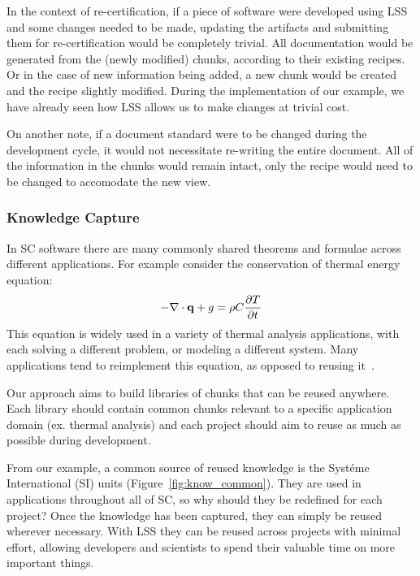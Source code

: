 \documentclass{sig-alternate-05-2015}
\newcommand{\lss}{LSS}
\begin{document}
In the context of re-certification, if a piece of software were developed using
\lss{} and some changes needed to be made, updating the artifacts and submitting
them for re-certification would be completely trivial. All documentation would
be generated from the (newly modified) chunks, according to their existing
recipes. Or in the case of new information being added, a new chunk would be
created and the recipe slightly modified. During the implementation of our
example, we have already seen how \lss{} allows us to make changes at trivial
cost.

On another note, if a document standard were to be changed during the
development cycle, it would not necessitate re-writing the entire document. All
of the information in the chunks would remain intact, only the recipe would need
to be changed to accomodate the new view.

\subsubsection{Knowledge Capture} \label{sssec:adv_knowledge}

In SC software there are many commonly shared theorems and formulae across
different applications. For example consider the conservation of thermal
energy equation:
\begin{displaymath} -{\bf \nabla \cdot q} + g = \rho C
\frac{\partial T}{\partial t} \end{displaymath}
This equation is widely used in a variety of thermal analysis applications, with
each solving a different problem, or modeling a different system. Many
applications tend to reimplement this equation, as opposed to reusing
it~\cite{TODO}. %

Our approach aims to build libraries of chunks that can be reused anywhere. Each
library should contain common chunks relevant to a specific application domain
(ex. thermal analysis) and each project should aim to reuse as much as possible
during development.

From our example, a common source of reused knowledge is the Syst\'{e}me
International (SI) units (Figure~\ref{fig:know_common}). They are used in
applications throughout all of SC, so why should they be redefined for each
project? Once the knowledge has been captured, they can simply be reused
wherever necessary. With \lss{} they can be reused across projects with minimal
effort, allowing developers and scientists to spend their valuable time on more
important things.
\end{document}
